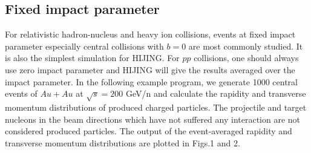 \subsection{Fixed impact parameter}

        For relativistic hadron-nucleus and heavy ion 
collisions, events at fixed impact
parameter especially central collisions with $b=0$ are most commonly
studied. It is also the simplest simulation for HIJING. For $pp$
collisions, one should always use zero impact parameter and HIJING
will give the results averaged over the impact parameter. In the
following example program, we generate 1000 central events of
$Au+Au$ at $\sqrt{s}=200$ GeV/n and calculate the rapidity and
transverse momentum distributions of produced charged particles. 
The projectile and target nucleons in the beam directions which 
have not suffered any interaction are not considered produced 
particles. The output of the event-averaged rapidity and transverse 
momentum distributions are plotted in Figs.1 and 2.

